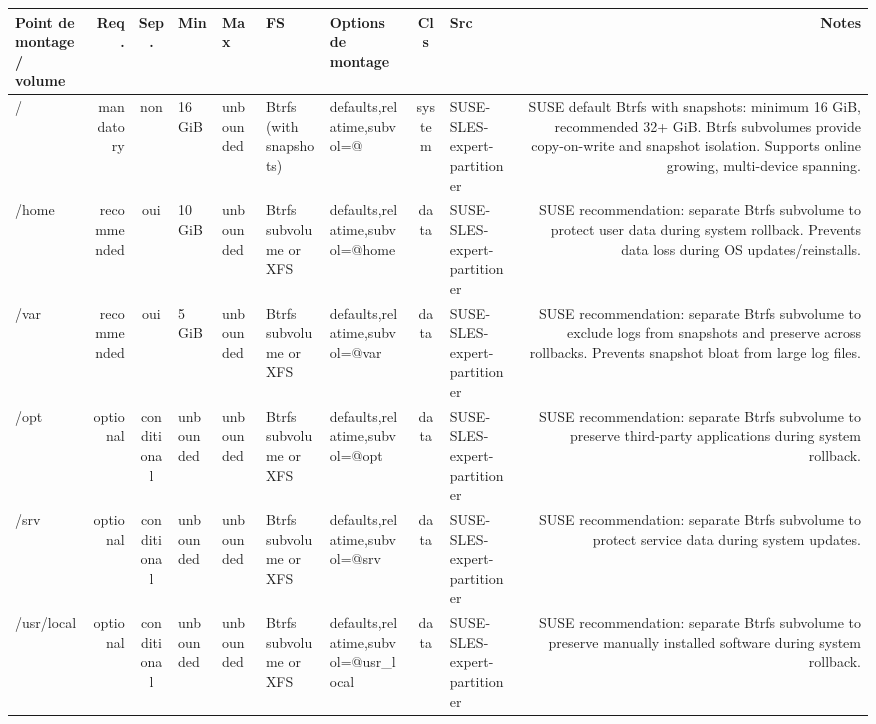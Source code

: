\documentclass[10pt,a4paper]{article}
\renewcommand{\arraystretch}{1.2}
\begin{document}
{\renewcommand{\arraystretch}{1.15}\begin{longtable}{M R S Z Z T O C I N}\toprule\textbf{\normalfont\scriptsize Point de montage / volume} & \textbf{\normalfont\scriptsize Req.} & \textbf{\normalfont\scriptsize Sep.} & \textbf{\normalfont\scriptsize Min} & \textbf{\normalfont\scriptsize Max} & \textbf{\normalfont\scriptsize FS} & \textbf{\normalfont\scriptsize Options de montage} & \textbf{\normalfont\scriptsize Cls} & \textbf{\normalfont\scriptsize Src} & \textbf{\normalfont\scriptsize Notes}\\\midrule\endhead
/ & \textcolor{cBlock}{mandatory} & non & 16 GiB & unbounded & Btrfs (with snapshots) & defaults,relatime,subvol=@ & system & SUSE-SLES-expert-partitioner & SUSE default Btrfs with snapshots: minimum 16 GiB, recommended 32+ GiB. Btrfs subvolumes provide copy-on-write and snapshot isolation. Supports online growing, multi-device spanning.\\
/home & \textcolor{cHigh}{recommended} & \textcolor{cOk}{oui} & 10 GiB & unbounded & Btrfs subvolume or XFS & defaults,relatime,subvol=@home & data & SUSE-SLES-expert-partitioner & SUSE recommendation: separate Btrfs subvolume to protect user data during system rollback. Prevents data loss during OS updates/reinstalls.\\
/var & \textcolor{cHigh}{recommended} & \textcolor{cOk}{oui} & 5 GiB & unbounded & Btrfs subvolume or XFS & defaults,relatime,subvol=@var & data & SUSE-SLES-expert-partitioner & SUSE recommendation: separate Btrfs subvolume to exclude logs from snapshots and preserve across rollbacks. Prevents snapshot bloat from large log files.\\
/opt & \textcolor{cLow}{optional} & conditional & unbounded & unbounded & Btrfs subvolume or XFS & defaults,relatime,subvol=@opt & data & SUSE-SLES-expert-partitioner & SUSE recommendation: separate Btrfs subvolume to preserve third-party applications during system rollback.\\
/srv & \textcolor{cLow}{optional} & conditional & unbounded & unbounded & Btrfs subvolume or XFS & defaults,relatime,subvol=@srv & data & SUSE-SLES-expert-partitioner & SUSE recommendation: separate Btrfs subvolume to protect service data during system updates.\\
/usr/local & \textcolor{cLow}{optional} & conditional & unbounded & unbounded & Btrfs subvolume or XFS & defaults,relatime,subvol=@usr\_local & data & SUSE-SLES-expert-partitioner & SUSE recommendation: separate Btrfs subvolume to preserve manually installed software during system rollback.\\
\bottomrule\end{longtable}}
\clearpage
\end{document}
